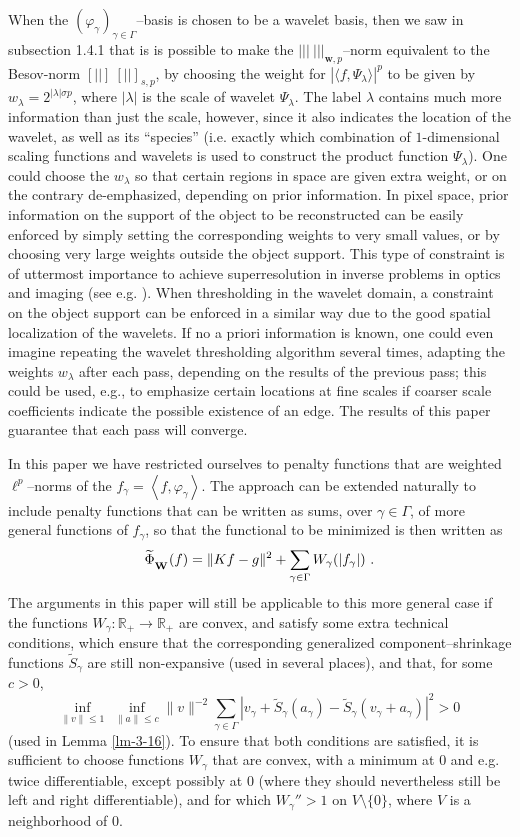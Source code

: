 \documentclass[10pt]{article}
\def\R{\mathbb{R}}
\def\fg{f_{\gamma}}
\def\Vvert{\vert\!\vert\!\vert}
\def\VVert{[\!|\!|\!]}
\begin{document}
When the $(\varphi_\gamma)_{\gamma \in \Gamma}$--basis is chosen to be a
wavelet basis,
then we saw in subsection 1.4.1 that is is possible to make the
$\Vvert ~ \Vvert_{\mathbf{w},p}$--norm equivalent to the Besov-norm
$\VVert ~ \VVert_{s,p}$, by choosing the weight for
$| \langle f, \Psi_\lambda \rangle |^p$ to be given by
$w_\lambda = 2^{|\lambda| \sigma p}$, where $|\lambda |$ is the scale of
wavelet
$\Psi_\lambda$. The label $\lambda$ contains much more information than just
the scale, however, since it also indicates the location of the wavelet,
as well as
its ``species'' (i.e. exactly which combination of $1$-dimensional scaling
functions
and wavelets is used to construct the product function $\Psi_\lambda$).
One could
choose the $w_\lambda$ so that certain regions in space are given
extra weight, or
on the contrary de-emphasized, depending on prior information.
In pixel space, prior information on the support of the object to be
reconstructed can be easily enforced by simply
setting the
corresponding weights to very small values,
or by choosing very large weights outside
the object support. This type of constraint is of uttermost importance
to achieve superresolution in inverse problems in optics and imaging
(see e.g. \cite{Ber96}).
 When thresholding in the wavelet domain,
a constraint on the object support can be enforced in a similar way due to the
good spatial localization of the wavelets.
If no a priori information is known,
one could
even imagine repeating the wavelet thresholding
algorithm several times, adapting
the weights $w_\lambda$
after each pass, depending on the results of the previous pass;
this could be used,
e.g., to emphasize certain locations at fine scales if coarser scale
coefficients
indicate the possible existence of an edge. The results of this paper
guarantee
that each pass will converge.

In this paper we have restricted ourselves to penalty functions that are
weighted $\ell^p$--norms of the $\fg = \left<f, \varphi_{\gamma} \right>$. The
approach can be extended naturally to include penalty functions that
can be written as sums, over $\gamma \in \Gamma$, of more general
functions of $\fg$, so that the functional to be minimized is then written
as
$$
\widetilde{\Phi}_{_{\mbox{\scriptsize{\bf{W}}}}}(f) = \|Kf-g\|^2 +
\sum_{\gamma \in \Gamma}
W_{\gamma} (|\fg|) ~.
$$
The arguments in this paper will still be applicable to this more general case
if the functions $W_{\gamma}: \R_+ \rightarrow \R_+$ are convex, and satisfy
some extra technical conditions, which ensure that the corresponding
generalized component--shrinkage functions $\widetilde{S}_{\gamma}$ are still
non-expansive (used in several places), and that, for some $c > 0$,
$$
\inf_{\|v\| \leq 1} ~ \inf_{\|a\| \leq c} \|v\|^{-2}
\sum_{\gamma \in \Gamma} \left|v_{\gamma} + \widetilde{S}_{\gamma}(a_{\gamma})
-\widetilde{S}_{\gamma}(v_{\gamma}+a_{\gamma}) \right|^2 > 0 ~
$$
(used in Lemma \ref{lm-3-16}).
To ensure that both conditions are satisfied, it is sufficient to choose
functions $W_{\gamma}$ that are convex, with a minimum at $0$ and e.g.
twice differentiable, except possibly at $0$ (where they should nevertheless
still be left and right differentiable), and for which $W_{\gamma}'' >1$
on $V \setminus \{0\}$, where $V$ is a neighborhood of $0$.
\end{document}
